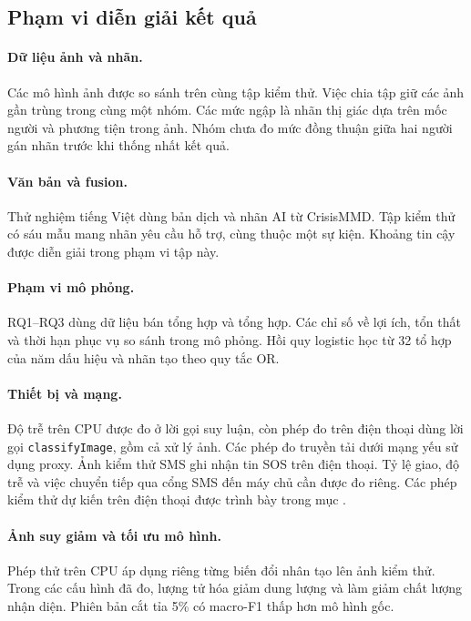 \begin{samepage}
\section{Phạm vi diễn giải kết quả}\label{sec:04-evaluation-limitations}
\paragraph{Dữ liệu ảnh và nhãn.}
Các mô hình ảnh được so sánh trên cùng tập kiểm thử. Việc chia tập giữ các ảnh gần trùng trong cùng một nhóm. Các mức ngập là nhãn thị giác dựa trên mốc người và phương tiện trong ảnh. Nhóm chưa đo mức đồng thuận giữa hai người gán nhãn trước khi thống nhất kết quả.

\paragraph{Văn bản và fusion.}
Thử nghiệm tiếng Việt dùng bản dịch và nhãn AI từ CrisisMMD. Tập kiểm thử có sáu mẫu mang nhãn yêu cầu hỗ trợ, cùng thuộc một sự kiện. Khoảng tin cậy được diễn giải trong phạm vi tập này.

\paragraph{Phạm vi mô phỏng.}
RQ1--RQ3 dùng dữ liệu bán tổng hợp và tổng hợp. Các chỉ số về lợi ích, tổn thất và thời hạn phục vụ so sánh trong mô phỏng. Hồi quy logistic học từ 32 tổ hợp của năm dấu hiệu và nhãn tạo theo quy tắc OR.

\paragraph{Thiết bị và mạng.}
Độ trễ trên CPU được đo ở lời gọi suy luận, còn phép đo trên điện thoại dùng lời gọi \texttt{classifyImage}, gồm cả xử lý ảnh. Các phép đo truyền tải dưới mạng yếu sử dụng proxy. Ảnh kiểm thử SMS ghi nhận tin SOS trên điện thoại. Tỷ lệ giao, độ trễ và việc chuyển tiếp qua cổng SMS đến máy chủ cần được đo riêng. Các phép kiểm thử dự kiến trên điện thoại được trình bày trong mục .

\paragraph{Ảnh suy giảm và tối ưu mô hình.}
Phép thử trên CPU áp dụng riêng từng biến đổi nhân tạo lên ảnh kiểm thử. Trong các cấu hình đã đo, lượng tử hóa giảm dung lượng và làm giảm chất lượng nhận diện. Phiên bản cắt tỉa 5\% có macro-F1 thấp hơn mô hình gốc.
\end{samepage}
